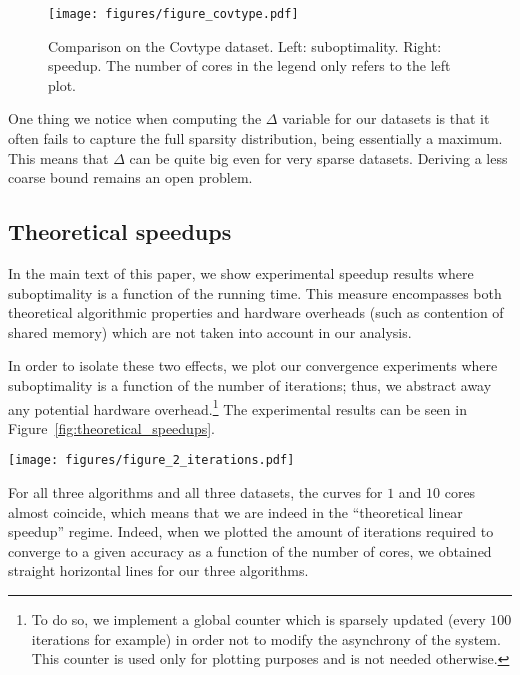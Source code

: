 \documentclass[twoside]{article}
\newcommand{\sparsity}{\Delta}
\newcommand{\ASAGA}{\textsc{Asaga}}
\newcommand{\SVRG}{\textsc{Svrg}}
\newcommand{\Hogwild}{\textsc{Hogwild}}
\begin{document}
\begin{figure}
\center \texttt{[image: figures/figure\_covtype.pdf]}
\caption{Comparison on the Covtype dataset. Left: suboptimality. Right: speedup. The number of cores in the legend only refers to the left plot. }\label{fig:covtype}
\end{figure}

One thing we notice when computing the $\sparsity$ variable for our datasets is that it often fails to capture the full sparsity distribution, being essentially a maximum.
This means that $\sparsity$ can be quite big even for very sparse datasets.
Deriving a less coarse bound remains an open problem.

\subsection{Theoretical speedups}\label{apx:speedup}
In the main text of this paper, we show experimental speedup results where suboptimality is a function of the running time.
This measure encompasses both theoretical algorithmic properties and hardware overheads (such as contention of shared memory) which are not taken into account in our analysis.

In order to isolate these two effects, we plot our convergence experiments where suboptimality is a function of the number of iterations; thus, we abstract away any potential hardware overhead.\footnote{To do so, we implement a global counter which is sparsely updated (every $100$ iterations for example) in order not to modify the asynchrony of the system. 
This counter is used only for plotting purposes and is not needed otherwise.
}
The experimental results can be seen in Figure~\ref{fig:theoretical_speedups}. 

\begin{figure*}
\texttt{[image: figures/figure\_2\_iterations.pdf]}
\caption{{\bf Theoretical speedups}. 
Suboptimality with respect to number of iterations for \ASAGA\, \SVRG\ and \Hogwild\ with 1 and 10 cores.  
Curves almost coincide, which means the theoretical speedup is almost the number of cores $p$, hence linear.}\label{fig:theoretical_speedups}
\end{figure*} 

For all three algorithms and all three datasets, the curves for $1$ and $10$ cores almost coincide, which means that we are indeed in the ``theoretical linear speedup'' regime.
Indeed, when we plotted the amount of iterations required to converge to a given accuracy as a function of the number of cores, we obtained straight  horizontal lines for our three algorithms.
 
\end{document}

